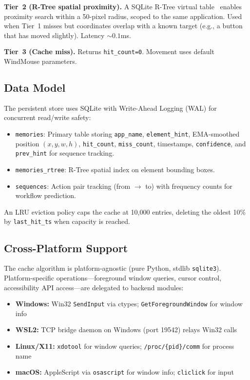 \documentclass[conference]{IEEEtran}
\begin{document}
\textbf{Tier~2 (R-Tree spatial proximity).} A SQLite R-Tree virtual table~\cite{guttman1984rtree,sqlite_rtree} enables proximity search within a 50-pixel radius, scoped to the same application. Used when Tier~1 misses but coordinates overlap with a known target (e.g., a button that has moved slightly). Latency ${\sim}0.1$ms.

\textbf{Tier~3 (Cache miss).} Returns \texttt{hit\_count=0}. Movement uses default WindMouse parameters.

\subsection{Data Model}

The persistent store uses SQLite with Write-Ahead Logging (WAL) for concurrent read/write safety:

\begin{itemize}[noitemsep,topsep=0pt]
    \item \texttt{memories}: Primary table storing \texttt{app\_name}, \texttt{element\_hint}, EMA-smoothed position $(x, y, w, h)$, \texttt{hit\_count}, \texttt{miss\_count}, timestamps, \texttt{confidence}, and \texttt{prev\_hint} for sequence tracking.
    \item \texttt{memories\_rtree}: R-Tree spatial index on element bounding boxes.
    \item \texttt{sequences}: Action pair tracking (from $\rightarrow$ to) with frequency counts for workflow prediction.
\end{itemize}

An LRU eviction policy caps the cache at 10{,}000 entries, deleting the oldest 10\% by \texttt{last\_hit\_ts} when capacity is reached.

\subsection{Cross-Platform Support}

The cache algorithm is platform-agnostic (pure Python, stdlib \texttt{sqlite3}). Platform-specific operations---foreground window queries, cursor control, accessibility API access---are delegated to backend modules:

\begin{itemize}[noitemsep,topsep=0pt]
    \item \textbf{Windows:} Win32 \texttt{SendInput} via ctypes; \texttt{GetForegroundWindow} for window info
    \item \textbf{WSL2:} TCP bridge daemon on Windows (port 19542) relays Win32 calls
    \item \textbf{Linux/X11:} \texttt{xdotool} for window queries; \texttt{/proc/\{pid\}/comm} for process name
    \item \textbf{macOS:} AppleScript via \texttt{osascript} for window info; \texttt{cliclick} for input
\end{itemize}
\end{document}
